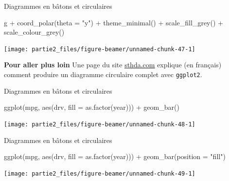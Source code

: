 \documentclass[12pt,ignorenonframetext,]{beamer}
\newenvironment{Shaded}{}{}
\newcommand{\KeywordTok}[1]{\textcolor[rgb]{0.00,0.00,1.00}{#1}}
\newcommand{\DataTypeTok}[1]{#1}
\newcommand{\StringTok}[1]{\textcolor[rgb]{0.00,0.50,0.50}{#1}}
\newcommand{\OperatorTok}[1]{#1}
\newcommand{\NormalTok}[1]{#1}
\renewenvironment{Shaded}{\begin{snugshade}}{\end{snugshade}}
\begin{document}
\begin{frame}[fragile]{Diagrammes en bâtons et circulaires}

\footnotesize \center

\begin{Shaded}
\begin{Highlighting}[]
\NormalTok{g }\OperatorTok{+}\StringTok{ }\KeywordTok{coord_polar}\NormalTok{(}\DataTypeTok{theta =} \StringTok{"y"}\NormalTok{) }\OperatorTok{+}\StringTok{ }\KeywordTok{theme_minimal}\NormalTok{() }\OperatorTok{+}
\StringTok{  }\KeywordTok{scale_fill_grey}\NormalTok{() }\OperatorTok{+}\StringTok{ }\KeywordTok{scale_colour_grey}\NormalTok{()}
\end{Highlighting}
\end{Shaded}

\texttt{[image: partie2\_files/figure-beamer/unnamed-chunk-47-1]}

\pause \raggedright \small

\textbf{Pour aller plus loin} Une page du site
\href{http://www.sthda.com/french/wiki/ggplot2-graphique-en-camembert-guide-de-demarrage-rapide-logiciel-r-et-visualisation-de-donnees}{\underline{sthda.com}}
explique (en français) comment produire un diagramme circulaire complet
avec \texttt{ggplot2}.

\end{frame}

\begin{frame}[fragile]{Diagrammes en bâtons et circulaires}

\footnotesize \center

\begin{Shaded}
\begin{Highlighting}[]
\KeywordTok{ggplot}\NormalTok{(mpg, }\KeywordTok{aes}\NormalTok{(drv, }\DataTypeTok{fill =} \KeywordTok{as.factor}\NormalTok{(year))) }\OperatorTok{+}\StringTok{ }
\StringTok{  }\KeywordTok{geom_bar}\NormalTok{()}
\end{Highlighting}
\end{Shaded}

\texttt{[image: partie2\_files/figure-beamer/unnamed-chunk-48-1]}

\end{frame}

\begin{frame}[fragile]{Diagrammes en bâtons et circulaires}

\footnotesize \center

\begin{Shaded}
\begin{Highlighting}[]
\KeywordTok{ggplot}\NormalTok{(mpg, }\KeywordTok{aes}\NormalTok{(drv, }\DataTypeTok{fill =} \KeywordTok{as.factor}\NormalTok{(year))) }\OperatorTok{+}\StringTok{ }
\StringTok{  }\KeywordTok{geom_bar}\NormalTok{(}\DataTypeTok{position =} \StringTok{"fill"}\NormalTok{)}
\end{Highlighting}
\end{Shaded}

\texttt{[image: partie2\_files/figure-beamer/unnamed-chunk-49-1]}

\end{frame}
\end{document}
